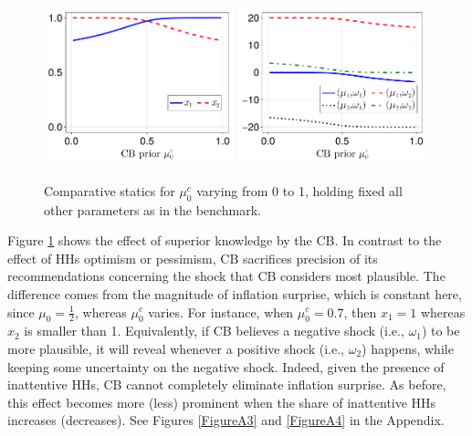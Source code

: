 \documentclass[12pt,a4paper]{article}
\begin{document}
\begin{figure}[H]
\centering
\includegraphics[width=0.49\textwidth]{figures/V8/γ_10/fig_optimal_π_across_μ_0_c_ω_1_1_ω_2_-1_δ_0.5_.pdf}
\includegraphics[width=0.49\textwidth]{figures/V8/γ_10/fig_posterior_across_μ_0_c_ω_1_1_ω_2_-1_δ_0.5_.pdf}
\caption{Comparative statics for $\mu_0^c$ varying from 0 to 1, holding fixed all other parameters as in the benchmark.}
\label{Figure2}
\end{figure}

Figure \ref{Figure2} shows the effect of superior knowledge by the CB. In contrast to the effect of HHs optimism or pessimism, CB sacrifices precision of its recommendations concerning the shock that CB considers most plausible. The difference comes from the magnitude of inflation surprise, which is constant here, since $\mu_0=\frac{1}{2}$, whereas $\mu_0^c$ varies. For instance, when $\mu_0^c=0.7$, then $x_1=1$ whereas $x_2$ is smaller than 1. Equivalently, if CB believes a negative shock (i.e., $\omega_1$) to be more plausible, it will reveal whenever a positive shock (i.e., $\omega_2$) happens, while keeping some uncertainty on the negative shock. Indeed, given the presence of inattentive HHs, CB cannot completely eliminate inflation surprise. As before, this effect becomes more (less) prominent when the share of inattentive HHs increases (decreases). See Figures \ref{FigureA3} and \ref{FigureA4} in the Appendix.
\end{document}
